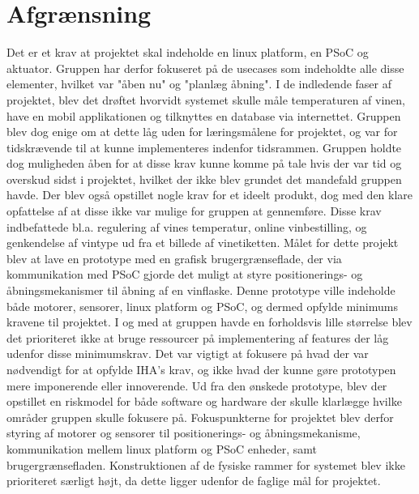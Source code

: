 \chapter{Afgrænsning}
Det er et krav at projektet skal indeholde en linux platform, en PSoC og aktuator. Gruppen har derfor fokuseret på de usecases som indeholdte alle disse elementer, 
hvilket var "åben nu" og "planlæg åbning". I de indledende faser af projektet, blev det drøftet hvorvidt systemet skulle måle temperaturen af vinen, have en 
mobil applikationen og tilknyttes en database via internettet. Gruppen blev dog enige om at dette låg uden for læringsmålene for projektet, og var for 
tidskrævende til at kunne implementeres indenfor tidsrammen. Gruppen holdte dog muligheden åben for at disse krav kunne komme på tale hvis der var tid og 
overskud sidst i projektet, hvilket der ikke blev grundet det mandefald gruppen havde. 
Der blev også opstillet nogle krav for et ideelt produkt, dog med den klare opfattelse af at disse ikke var mulige for gruppen at gennemføre. Disse krav 
indbefattede bl.a. regulering af vines temperatur, online vinbestilling, og genkendelse af vintype ud fra et billede af vinetiketten. 
Målet for dette projekt blev at lave en prototype med en grafisk brugergrænseflade, der via kommunikation med PSoC gjorde det muligt at styre positionerings- 
og åbningsmekanismer til åbning af en vinflaske. Denne prototype ville indeholde både motorer, sensorer, linux platform og PSoC, og dermed opfylde minimums 
kravene til projektet. I og med at gruppen havde en forholdsvis lille størrelse blev det prioriteret ikke at bruge ressourcer på implementering af features der 
låg udenfor disse minimumskrav. Det var vigtigt at fokusere på hvad der var nødvendigt for at opfylde IHA's krav, og ikke hvad der kunne gøre prototypen mere 
imponerende eller innoverende. Ud fra den ønskede prototype, blev der opstillet en riskmodel for både software og hardware der skulle klarlægge hvilke områder 
gruppen skulle fokusere på. Fokuspunkterne for projektet blev derfor styring af motorer og sensorer til positionerings- og åbningsmekanisme, kommunikation mellem 
linux platform og PSoC enheder, samt brugergrænsefladen. Konstruktionen af de fysiske rammer for systemet blev ikke prioriteret særligt højt, da dette ligger 
udenfor de faglige mål for projektet.       